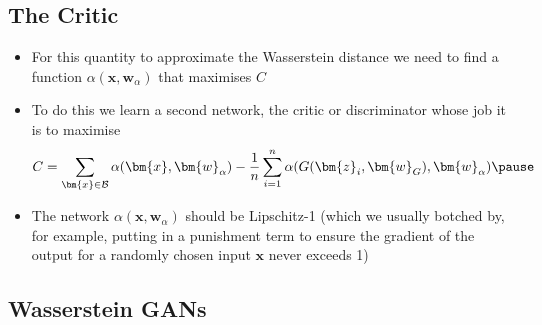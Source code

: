 
\begin{slide}
\section{The Critic}

\begin{PauseHighLight}
  \begin{itemize}
  \item For this quantity to approximate the Wasserstein distance we
    need to find a function $\alpha(\bm{x},\bm{w}_\alpha)$ that
    maximises $C$\pause
  \item To do this we learn a second network, the critic or
    discriminator whose job it is to maximise
    \begin{align*}
      C = \sum_{\bm{x}\in\mathcal{B}} \alpha(\bm{x},\bm{w}_\alpha) -
      \frac{1}{n} \sum_{i=1}^n \alpha(G(\bm{z}_i,\bm{w}_G),\bm{w}_\alpha)\pause
    \end{align*}
  \item The network $\alpha(\bm{x},\bm{w}_\alpha)$ should be
    Lipschitz-1 (which we usually botched by, for example, putting in
    a punishment term to ensure the gradient of the output for a
    randomly chosen input $\bm{x}$ never exceeds 1)\pause
  \end{itemize}
\end{PauseHighLight}

\end{slide}



\begin{slide}
\section{Wasserstein GANs}

\pb\pause{}
\begin{center}
  \pause
\end{center}
\end{slide}



